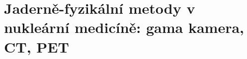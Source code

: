\section[Jaderně-fyzikální metody v nukleární medicíně]{Jaderně-fyzikální metody v nukleární medicíně: gama kamera, CT, PET}

